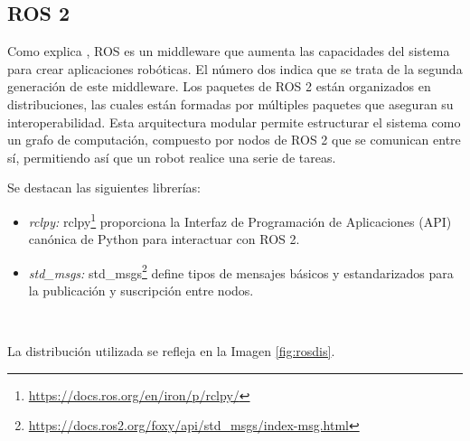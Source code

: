 \subsection{ROS 2}
\label{sec:entornos}

Como explica \cite{perales10a}, ROS es un middleware que aumenta las capacidades del sistema para crear aplicaciones robóticas. El número dos indica que se trata de la segunda generación de este middleware.
Los paquetes de ROS 2 están organizados en distribuciones, las cuales están formadas por múltiples paquetes que aseguran su interoperabilidad.
Esta arquitectura modular permite estructurar el sistema como un grafo de computación, compuesto por nodos de ROS 2 que se comunican entre sí, permitiendo así que un robot realice una serie de tareas.

Se destacan las siguientes librerías:

\begin{itemize}
    \item \textit{rclpy:} rclpy\footnote{\url{https://docs.ros.org/en/iron/p/rclpy/}} proporciona la Interfaz de Programación de Aplicaciones (API) canónica de Python para interactuar con ROS 2.
    \item \textit{std\_msgs:} std\_msgs\footnote{\url{https://docs.ros2.org/foxy/api/std_msgs/index-msg.html}} define tipos de mensajes básicos y estandarizados para la publicación y suscripción entre nodos.
\end{itemize}\

La distribución utilizada se refleja en la Imagen \ref{fig:rosdis}.

